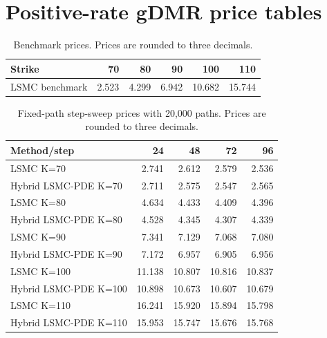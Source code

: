 \section*{Positive-rate gDMR price tables}
\begin{table}[htbp]\centering
\caption{Benchmark prices. Prices are rounded to three decimals.}
\begin{tabular}{lrrrrr}
\toprule
Strike & 70 & 80 & 90 & 100 & 110 \\
\midrule
LSMC benchmark & 2.523 & 4.299 & 6.942 & 10.682 & 15.744 \\
\bottomrule
\end{tabular}
\end{table}

\begin{table}[htbp]\centering
\caption{Fixed-path step-sweep prices with 20,000 paths. Prices are rounded to three decimals.}
\begin{tabular}{lrrrr}
\toprule
Method/step & 24 & 48 & 72 & 96 \\
\midrule
LSMC K=70 & 2.741 & 2.612 & 2.579 & 2.536 \\
Hybrid LSMC-PDE K=70 & 2.711 & 2.575 & 2.547 & 2.565 \\
LSMC K=80 & 4.634 & 4.433 & 4.409 & 4.396 \\
Hybrid LSMC-PDE K=80 & 4.528 & 4.345 & 4.307 & 4.339 \\
LSMC K=90 & 7.341 & 7.129 & 7.068 & 7.080 \\
Hybrid LSMC-PDE K=90 & 7.172 & 6.957 & 6.905 & 6.956 \\
LSMC K=100 & 11.138 & 10.807 & 10.816 & 10.837 \\
Hybrid LSMC-PDE K=100 & 10.898 & 10.673 & 10.607 & 10.679 \\
LSMC K=110 & 16.241 & 15.920 & 15.894 & 15.798 \\
Hybrid LSMC-PDE K=110 & 15.953 & 15.747 & 15.676 & 15.768 \\
\bottomrule
\end{tabular}
\end{table}


